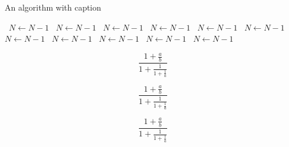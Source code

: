 \documentclass[a4paper]{article}
\begin{document}
\begin{algorithm}
\caption{An algorithm with caption}
\begin{algorithmic}
\    \State $N \gets N - 1$
\    \State $N \gets N - 1$
\    \State $N \gets N - 1$
\    \State $N \gets N - 1$
\    \State $N \gets N - 1$
\    \State $N \gets N - 1$
\    \State $N \gets N - 1$
\    \State $N \gets N - 1$
\    \State $N \gets N - 1$
\    \State $N \gets N - 1$
\    \State $N \gets N - 1$
\EndWhile
\end{algorithmic}
\end{algorithm}

\[ \frac{1+\frac{a}{b}}{1+\frac{1}{1+\frac{1}{a}}} \]

\[ \frac{1+\frac{a}{b}}{1+\frac{1}{1+\frac{1}{a}}} \]

\[ \frac{1+\frac{a}{b}}{1+\frac{1}{1+\frac{1}{a}}} \]
\end{document}
